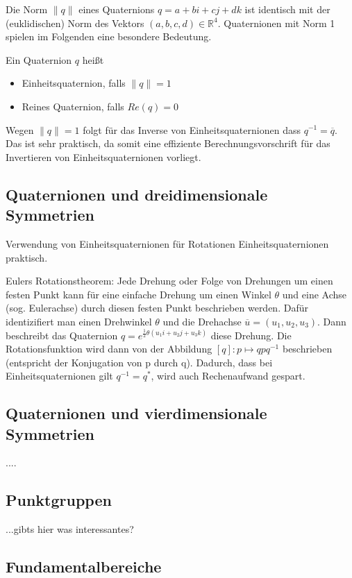 Die Norm $\|q\|$ eines Quaternions $q = a + bi + cj + dk$ ist identisch mit der (euklidischen) Norm des Vektors $(a,b,c,d) \in \mathbb{R}^4$.
Quaternionen mit Norm 1 spielen im Folgenden eine besondere Bedeutung.

\begin{definition}
Ein Quaternion $q$ heißt 
\begin{itemize}
\item Einheitsquaternion, falls $\|q\| = 1$
\item Reines Quaternion, falls $Re(q) = 0$
\end{itemize}\vspace{-0.9cm}
\end{definition}
Wegen $\|q\| = 1$ folgt für das Inverse von Einheitsquaternionen dass $q^{-1} = \overline{q}$. Das ist sehr praktisch,
da somit eine effiziente Berechnungsvorschrift für das Invertieren von Einheitsquaternionen vorliegt.

\subsection{Quaternionen und dreidimensionale Symmetrien}
Verwendung von Einheitsquaternionen für Rotationen 
Einheitsquaternionen praktisch.

Eulers Rotationstheorem: Jede Drehung oder Folge von Drehungen um einen festen Punkt kann für eine einfache Drehung um einen Winkel $\theta$ und eine Achse (sog. Eulerachse) durch diesen festen Punkt beschrieben werden. Dafür identizifiert man einen 
Drehwinkel $\theta$ und die Drehachse $\overline{u} = (u_1,u_2,u_3)$.
Dann beschreibt das Quaternion $q = e^{\frac{1}{2}\theta(u_1i + u_2j + u_3k)}$ diese Drehung.
Die Rotationsfunktion wird dann von der Abbildung $[q]: p \mapsto q p q^{-1}$ beschrieben (entspricht der Konjugation von p durch q).
Dadurch, dass bei Einheitsquaternionen gilt $q^{-1} = q^*$, wird auch Rechenaufwand gespart.

\subsection{Quaternionen und vierdimensionale Symmetrien}
....

\subsection{Punktgruppen}
...gibts hier was interessantes?

\subsection{Fundamentalbereiche}\label{fundamentalbereich}

